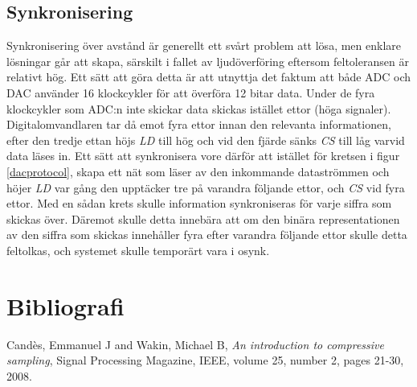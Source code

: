 \documentclass[a4paper,10pt]{article}
\begin{document}
\subsection{Synkronisering}
\label{synkronisering}
Synkronisering över avstånd är generellt ett svårt problem att lösa, men enklare 
lösningar går att skapa, särskilt i fallet av ljudöverföring eftersom 
feltoleransen är relativt hög. Ett sätt att göra detta är att utnyttja det 
faktum att både ADC och DAC använder 16 klockcykler för att överföra 12 bitar 
data. Under de fyra klockcykler som ADC:n inte skickar data skickas istället 
ettor (höga signaler). Digitalomvandlaren tar då emot fyra ettor innan den 
relevanta informationen, efter den tredje ettan höjs \emph{LD} till hög och vid 
den fjärde sänks \emph{CS} till låg varvid data läses in. Ett sätt att 
synkronisera vore därför att istället för kretsen i figur \ref{dacprotocol}, 
skapa ett nät som läser av den inkommande dataströmmen och höjer \emph{LD} var 
gång den upptäcker tre på varandra följande ettor, och \emph{CS} vid fyra ettor. 
Med en sådan krets skulle information synkroniseras för varje siffra som skickas 
över. Däremot skulle detta innebära att om den binära representationen av den 
siffra som skickas innehåller fyra efter varandra följande ettor skulle detta 
feltolkas, och systemet skulle temporärt vara i osynk.


\section{Bibliografi}

\begin{thebibliography}{hejhej}

    {Cand{\`e}s, Emmanuel J and Wakin, Michael B,
    \emph{An introduction to compressive sampling},
    Signal Processing Magazine, IEEE,
    volume 25,
    number 2,
    pages 21-30,
    2008.
}
\end{thebibliography}
\end{document}
